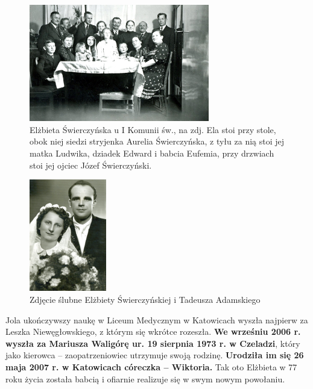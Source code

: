 \begin{figure}[!h]
\begin{center}
\includegraphics[width=0.7\textwidth]{photo/elzbieta_swierczynska_1.jpg}
\caption[Elżbieta Świerczyńska u I Komunii św.]{Elżbieta Świerczyńska u I Komunii św., na zdj. Ela stoi przy stole, obok niej siedzi stryjenka Aurelia Świerczyńska, z tyłu za nią stoi jej matka Ludwika, dziadek Edward i babcia Eufemia, przy drzwiach stoi jej ojciec Józef Świerczyński.}
\label{rys:elzbieta_swierczynska_1}
\end{center}
\end{figure}

\begin{figure}[!h]
\begin{center}
\includegraphics[width=0.3\textwidth]{photo/elzbieta_tadeusz_adamscy.jpg}
\caption{Zdjęcie ślubne Elżbiety Świerczyńskiej i Tadeusza Adamskiego}
\label{rys:elzbieta_tadeusz_adamscy}
\end{center}
\end{figure}

Jola ukończywszy naukę w Liceum Medycznym w Katowicach wyszła najpierw za Leszka Niewęgłowskiego, z którym się wkrótce rozeszła. \textbf{We wrześniu 2006 r. wyszła za Mariusza Waligórę ur. 19 sierpnia 1973 r. w Czeladzi}, który jako kierowca -- zaopatrzeniowiec utrzymuje swoją rodzinę. \textbf{Urodziła im się 26 maja 2007 r. w Katowicach córeczka -- Wiktoria.}
Tak oto Elżbieta w 77 roku życia została babcią i ofiarnie realizuje się w swym nowym powołaniu.

